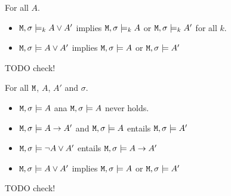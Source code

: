 \documentclass[acmsmall,screen]{acmart}
\begin{document}
\begin{appendix}
\begin{observation}
\begin{mylemma} For all $A$.

\begin{itemize}
\item
 ${\mbox{\tt{M}}}, \sigma \models_k  A \vee A' $ implies ${\mbox{\tt{M}}}, \sigma \models_k  A $ or  ${\mbox{\tt{M}}}, \sigma \models_k A' $ for all $k$.
 \item
 ${\mbox{\tt{M}}}, \sigma \models  A \vee A' $ implies ${\mbox{\tt{M}}}, \sigma \models   A $ or  ${\mbox{\tt{M}}}, \sigma \models  A' $
\end{itemize}
 \end{mylemma}

TODO check!

\end{observation}

\begin{conjecture}[Consistency]
For all ${\mbox{\tt{M}}}$, $A$, $A'$ and $\sigma$.

\begin{itemize}
\item
 ${\mbox{\tt{M}}}, \sigma \models  A$  ana  ${\mbox{\tt{M}}}, \sigma \models   A $ never holds.
 \item
 ${\mbox{\tt{M}}}, \sigma \models  A \rightarrow A' $ and  ${\mbox{\tt{M}}}, \sigma \models  A$ entails  ${\mbox{\tt{M}}}, \sigma \models  A'$
 \item
  ${\mbox{\tt{M}}}, \sigma \models  \neg A \vee A' $ entails  ${\mbox{\tt{M}}}, \sigma \models   A \rightarrow A' $
  \item
 ${\mbox{\tt{M}}}, \sigma \models  A \vee A' $ implies ${\mbox{\tt{M}}}, \sigma \models   A $ or  ${\mbox{\tt{M}}}, \sigma \models  A' $
\end{itemize}

\end{conjecture}

TODO check!




\end{appendix}
\end{document}
